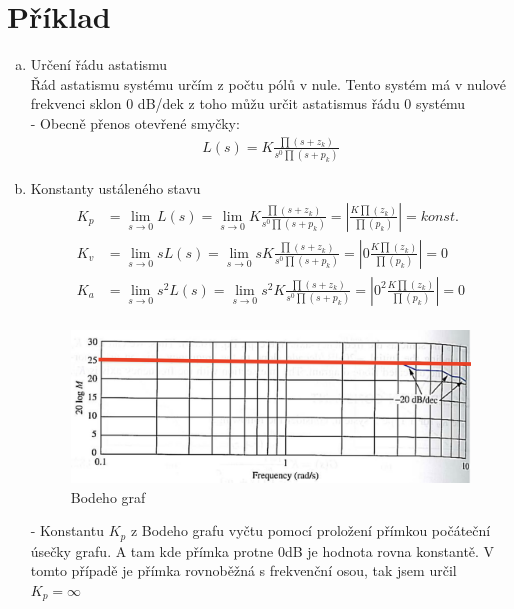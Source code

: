 \documentclass{article}
\begin{document}
\section{Příklad}
\begin{enumerate}[a)]
    \item Určení řádu astatismu\\
    Řád astatismu systému určím z počtu pólů v nule. Tento systém má v nulové frekvenci sklon 0 dB/dek z toho můžu určit astatismus řádu 0 systému\\
    - Obecně přenos otevřené smyčky: 
    \begin{align*}
        L(s) = K\frac{\prod(s+z_k)}{s^0\prod(s+p_k)}
    \end{align*}
    
    \item Konstanty ustáleného stavu
    \begin{align*}
        K_p &= \lim_{s \to 0} L(s) = \lim_{s \to 0} K\frac{\prod(s+z_k)}{s^0\prod(s+p_k)} = \left| \frac{K \prod(z_k)}{\prod(p_k)} \right| = konst.\\
        K_v &= \lim_{s \to 0} sL(s) = \lim_{s \to 0} sK\frac{\prod(s+z_k)}{s^0\prod(s+p_k)} = \left| 0\frac{K \prod(z_k)}{\prod(p_k)} \right| = 0\\
        K_a &= \lim_{s \to 0} s^2L(s) = \lim_{s \to 0} s^2K\frac{\prod(s+z_k)}{s^0\prod(s+p_k)} = \left| 0^2\frac{K \prod(z_k)}{\prod(p_k)} \right| = 0\\
    \end{align*}

    \begin{figure}[h]
        \centering
        \includegraphics[clip, width=1.00\textwidth]{Konstanta rychlosti.png}
        \caption{Bodeho graf}
        \label{fig:Bode_plot}
    \end{figure}
    - Konstantu $K_p$ z Bodeho grafu vyčtu pomocí proložení přímkou počáteční úsečky grafu. A tam kde přímka protne 0dB je hodnota rovna konstantě. V tomto případě je přímka rovnoběžná s frekvenční osou, tak jsem určil $K_p = \infty$


\end{enumerate}
\end{document}
